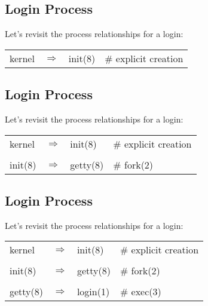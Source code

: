 \documentclass[xga]{xdvislides}
\begin{document}
\subsection{Login Process}
Let's revisit the process relationships for a login:
\vspace*{\fill}
\begin{center}
\begin{tabular}[width=.75\texwidth]{l c l l}
kernel & $\Rightarrow$ & init(8) & \# explicit creation\\
\end{tabular}
\end{center}
\vspace*{\fill}

\subsection{Login Process}
Let's revisit the process relationships for a login:
\vspace*{\fill}
\begin{center}
\begin{tabular}[width=.75\texwidth]{l c l l}
kernel & $\Rightarrow$ & init(8) & \# explicit creation\\
\\
init(8) & $\Rightarrow$ & getty(8) & \# fork(2) \\
\end{tabular}
\end{center}
\vspace*{\fill}

\subsection{Login Process}
Let's revisit the process relationships for a login:
\vspace*{\fill}
\begin{center}
\begin{tabular}[width=.75\texwidth]{l c l l}
kernel & $\Rightarrow$ & init(8) & \# explicit creation\\
\\
init(8) & $\Rightarrow$ & getty(8) & \# fork(2) \\
\\
getty(8) & $\Rightarrow$ & login(1) & \# exec(3) \\
\end{tabular}
\end{center}
\vspace*{\fill}
\end{document}
